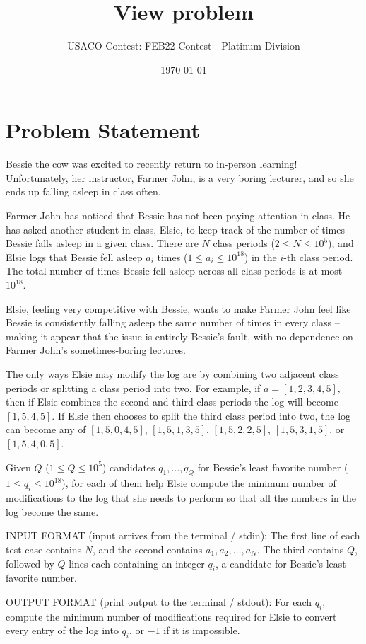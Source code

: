 \documentclass[12pt]{article}
\title{View problem}
\author{USACO Contest: FEB22 Contest - Platinum Division}
\date{\today}
\begin{document}
\maketitle

\section*{Problem Statement}

Bessie the cow was excited to recently return to in-person learning!
Unfortunately, her instructor, Farmer John, is a very boring lecturer, and so
she ends up falling asleep in class often.

Farmer John has noticed that Bessie has not been paying attention in class. He
has asked another student in class, Elsie, to keep track of the number of times
Bessie falls asleep in a given class. There are $N$ class periods
($2\le N\le 10^5$), and Elsie logs that Bessie fell asleep $a_i$ times
($1\le a_i\le 10^{18}$) in the $i$-th class period. The total number of times
Bessie fell asleep across all class periods is at most $10^{18}$.

Elsie, feeling very competitive with Bessie, wants to make Farmer John feel like
Bessie is consistently falling asleep the same number of times in every class --
making it appear that the issue is entirely Bessie's fault, with no dependence
on Farmer John's sometimes-boring lectures. 

The only ways Elsie may modify the log are by combining two adjacent class
periods or splitting a class period into two. For example, if $a=[1,2,3,4,5],$
then if Elsie combines the second and third class periods the log will become
$[1,5,4,5]$. If Elsie then chooses to split the third class period into two, the
log can become any of $[1,5,0,4,5]$, $[1,5,1,3,5]$, $[1,5,2,2,5]$,
$[1,5,3,1,5]$, or $[1,5,4,0,5]$.

Given $Q$ ($1\le Q\le 10^5$) candidates $q_1,\ldots,q_Q$ for Bessie's least
favorite number  ($1\le q_i\le 10^{18}$), for each of them help Elsie compute
the minimum number of modifications to the log that she needs to perform so that
all the numbers in the log become the same.

INPUT FORMAT (input arrives from the terminal / stdin):
The first line of each test case contains $N$, and the second contains
$a_1,a_2,\ldots,a_N$. The third contains $Q$, followed by $Q$ lines each
containing an integer $q_i$, a candidate for Bessie's least favorite number.  

OUTPUT FORMAT (print output to the terminal / stdout):
For each $q_i$, compute the minimum number of modifications required for Elsie
to convert every entry of the log into $q_i$, or $-1$ if it is impossible.
\end{document}
